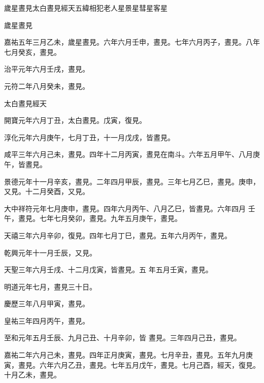 
\begin{pinyinscope}

 歲星晝見太白晝見經天五緯相犯老人星景星彗星客星



 歲星晝見



 嘉祐五年三月乙未，歲星晝見。六年六月壬申，晝見。七年六月丙子，晝見。八年七月癸亥，晝見。



 治平元年六月壬戌，晝見。



 元符二年八月癸未，晝見。



 太白晝見經天



 開寶元年六月丁丑，太白晝見。戊寅，復見。



 淳化元年六月庚午，七月丁丑，十一月戊戌，皆晝見。



 咸平三年六月己未，晝見。四年十二月丙寅，晝見在南斗。六年五月甲午、八月庚午，皆晝見。



 景德元年十一月辛亥，晝見。二年四月甲辰，晝見。三年七月乙巳，晝見。庚申，又見。十二月癸酉，又見。



 大中祥符元年七月庚申，晝見。四年六月丙午、八月乙巳，皆晝見。六年四月
 壬午，晝見。七年七月癸卯，晝見。九年五月庚午，晝見。



 天禧三年六月辛卯，復見。四年七月丁巳，晝見。五年六月丙午，晝見。



 乾興元年十一月壬辰，又見。



 天聖三年六月壬戌、十二月戊寅，皆晝見。五
 年五月壬寅，晝見。



 明道元年七月，晝見三十日。



 慶歷三年八月甲寅，晝見。



 皇祐三年四月丙午，晝見。



 至和元年五月壬辰、九月己丑、十月辛卯，皆
 晝見。三年四月己丑，晝見。



 嘉祐二年六月己未，晝見。四年正月庚寅，晝見。七月辛丑，晝見。五年九月庚寅，晝見。六年六月乙丑，晝見。七年五月戊午，晝見。七月己酉，經天，復見。十月乙未，晝見。




\end{pinyinscope}
